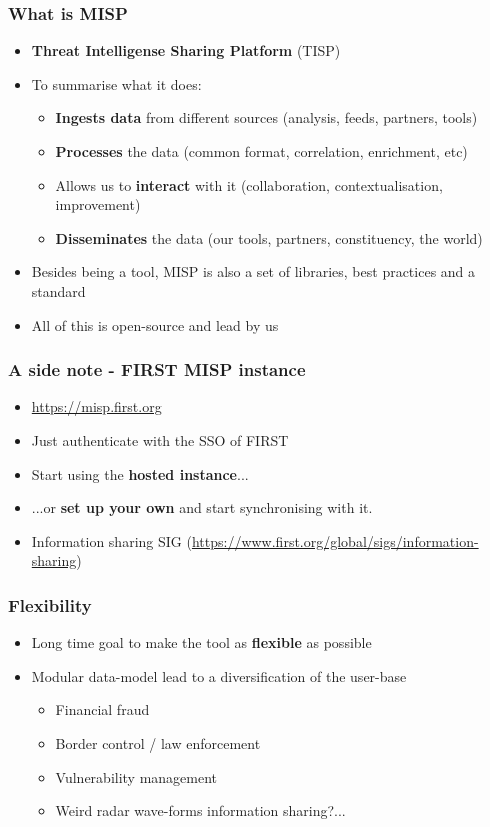 \begin{frame}
 \frametitle{What is MISP}
 \begin{itemize}
         \item {\bf Threat Intelligense Sharing Platform} (TISP)
         \item To summarise what it does:
         \begin{itemize}
             \item {\bf Ingests data} from different sources (analysis, feeds, partners, tools)
             \item {\bf Processes} the data (common format, correlation, enrichment, etc)
             \item Allows us to {\bf interact} with it (collaboration, contextualisation, improvement)
             \item {\bf Disseminates} the data (our tools, partners, constituency, the world)
         \end{itemize}
         \item Besides being a tool, MISP is also a set of libraries, best practices and a standard
         \item All of this is open-source and lead by us
 \end{itemize}
\end{frame}

\begin{frame}
 \frametitle{A side note - FIRST MISP instance}
 \begin{itemize}
         \item \url{https://misp.first.org}
         \item Just authenticate with the SSO of FIRST
         \item Start using the {\bf hosted instance}...
         \item ...or {\bf set up your own} and start synchronising with it.
         \item Information sharing SIG (\url{https://www.first.org/global/sigs/information-sharing})
 \end{itemize}
\end{frame}

\begin{frame}
 \frametitle{Flexibility}
 \begin{itemize}
         \item Long time goal to make the tool as {\bf flexible} as possible
         \item Modular data-model lead to a diversification of the user-base
         \begin{itemize}
             \item Financial fraud
             \item Border control / law enforcement
             \item Vulnerability management
             \item Weird radar wave-forms information sharing?...
         \end{itemize}
 \end{itemize}
\end{frame}

